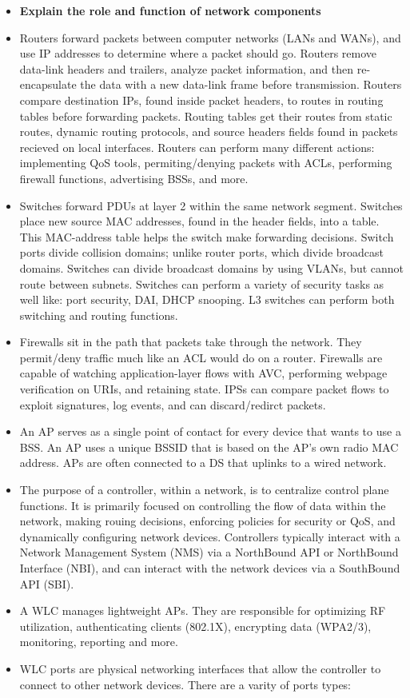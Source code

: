 \documentclass{article}
\begin{document}
\begin{itemize}
  \item \textbf{Explain the role and function of network components}
  	\item[] Routers forward packets between computer networks (LANs and WANs), and use IP addresses to determine where a packet should go. Routers remove data-link headers and trailers, analyze packet information, and then re-encapsulate the data with a new data-link frame before transmission. Routers compare destination IPs, found inside packet headers, to routes in routing tables before forwarding packets. Routing tables get their routes from static routes, dynamic routing protocols, and source headers fields found in packets recieved on local interfaces. Routers can perform many different actions: implementing QoS tools, permiting/denying packets with ACLs, performing firewall functions, advertising BSSs, and more. 
	\item[] Switches forward PDUs at layer 2 within the same network segment. Switches place new source MAC addresses, found in the header fields, into a table. This MAC-address table helps the switch make forwarding decisions. Switch ports divide collision domains; unlike router ports, which divide broadcast domains. Switches can divide broadcast domains by using VLANs, but cannot route between subnets. Switches can perform a variety of security tasks as well like: port security, DAI, DHCP snooping. L3 switches can perform both switching and routing functions.
	\item[] Firewalls sit in the path that packets take through the network. They permit/deny traffic much like an ACL would do on a router. Firewalls are capable of watching application-layer flows with AVC, performing webpage verification on URIs, and retaining state. IPSs can compare packet flows to exploit signatures, log events, and can discard/redirct packets.
	\item[] An AP serves as a single point of contact for every device that wants to use a BSS. An AP uses a unique BSSID that is based on the AP's own radio MAC address. APs are often connected to a DS that uplinks to a wired network.
 	\item[] The purpose of a controller, within a network, is to centralize control plane functions. It is primarily focused on controlling the flow of data within the network, making rouing decisions, enforcing policies for security or QoS, and dynamically configuring network devices. Controllers typically interact with a Network Management System (NMS) via a NorthBound API or NorthBound Interface (NBI), and can interact with the network devices via a SouthBound API (SBI).\\
  	\item[] A WLC manages lightweight APs. They are responsible for optimizing RF utilization, authenticating clients (802.1X), encrypting data (WPA2/3), monitoring, reporting and more.\\
  	\item[] WLC ports are physical networking interfaces that allow the controller to connect to other network devices. There are a varity of ports types:\\
  	

\end{itemize}
\end{document}
